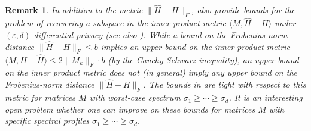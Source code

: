 \documentclass[11pt,letterpaper]{article}
\renewcommand{\epsilon}{\varepsilon}
\newtheorem{remark}[theorem]{Remark}
\begin{document}
\begin{remark}
In addition to the metric  $\|\hat{H}- H\|_F$,  \cite{dwork2014analyze} also provide bounds for the problem of recovering a subspace in the inner product metric $\langle M, \hat{H}-H \rangle$ under $(\epsilon, \delta)$-differential privacy (see also \cite{chaudhuri2012near, dwork2014analyze, gilad2017smooth,amin2019differentially}).
%
%
 While a bound on the Frobenius norm distance $\| \hat{H}-H \|_F \leq b$  implies an upper bound on the inner product metric $\langle M, H - \hat{H} \rangle \leq 2\| M_{k}\|_F \cdot b$ (by the Cauchy-Schwarz inequality), an upper bound on the inner product metric does not (in general) imply any upper bound on the Frobenius-norm distance $\| \hat{H} -H \|_F$.
%
The bounds in \cite{dwork2014analyze} are tight with respect to this metric for matrices $M$ with worst-case spectrum $\sigma_1 \geq \cdots \geq \sigma_d$.
%
It is an interesting open problem whether one can improve on these bounds for matrices $M$ with specific spectral profiles $\sigma_1 \geq \cdots \geq \sigma_d$.
\end{remark}
\color{black}
\end{document}
